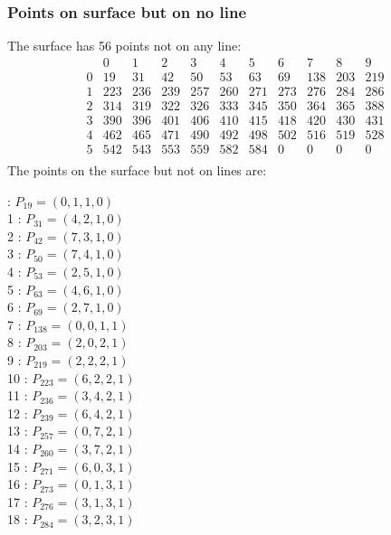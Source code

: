 \documentclass{article}
\begin{document}
{\subsubsection*{Points on surface but on no line}
The surface has 56 points not on any line:\\
$$
\begin{array}{r|*{10}{r}}
 & 0 & 1 & 2 & 3 & 4 & 5 & 6 & 7 & 8 & 9\\
\hline
0 & 19 & 31 & 42 & 50 & 53 & 63 & 69 & 138 & 203 & 219\\
1 & 223 & 236 & 239 & 257 & 260 & 271 & 273 & 276 & 284 & 286\\
2 & 314 & 319 & 322 & 326 & 333 & 345 & 350 & 364 & 365 & 388\\
3 & 390 & 396 & 401 & 406 & 410 & 415 & 418 & 420 & 430 & 431\\
4 & 462 & 465 & 471 & 490 & 492 & 498 & 502 & 516 & 519 & 528\\
5 & 542 & 543 & 553 & 559 & 582 & 584 & 0 & 0 & 0 & 0\\
\end{array}
$$
The points on the surface but not on lines are:\\
\begin{multicols}{2}
 : $P_{19}=( 0, 1, 1, 0 )$\\
1 : $P_{31}=( 4, 2, 1, 0 )$\\
2 : $P_{42}=( 7, 3, 1, 0 )$\\
3 : $P_{50}=( 7, 4, 1, 0 )$\\
4 : $P_{53}=( 2, 5, 1, 0 )$\\
5 : $P_{63}=( 4, 6, 1, 0 )$\\
6 : $P_{69}=( 2, 7, 1, 0 )$\\
7 : $P_{138}=( 0, 0, 1, 1 )$\\
8 : $P_{203}=( 2, 0, 2, 1 )$\\
9 : $P_{219}=( 2, 2, 2, 1 )$\\
10 : $P_{223}=( 6, 2, 2, 1 )$\\
11 : $P_{236}=( 3, 4, 2, 1 )$\\
12 : $P_{239}=( 6, 4, 2, 1 )$\\
13 : $P_{257}=( 0, 7, 2, 1 )$\\
14 : $P_{260}=( 3, 7, 2, 1 )$\\
15 : $P_{271}=( 6, 0, 3, 1 )$\\
16 : $P_{273}=( 0, 1, 3, 1 )$\\
17 : $P_{276}=( 3, 1, 3, 1 )$\\
18 : $P_{284}=( 3, 2, 3, 1 )$\\

\end{multicols}}
\end{document}
